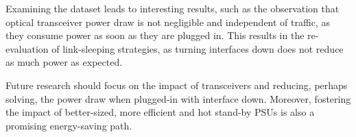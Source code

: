 Examining the dataset leads to interesting results, such as the observation that optical transceiver power draw is not negligible and independent of traffic, as they consume power as soon as they are plugged in.
This results in the re-evaluation of link-sleeping strategies, as turning interfaces down does not reduce as much power as expected.    

Future research should focus on the impact of transceivers and reducing, perhaps solving, the power draw when plugged-in with interface down. 
Moreover, fostering the impact of better-sized, more efficient and hot stand-by PSUs is also a promising energy-saving path.

